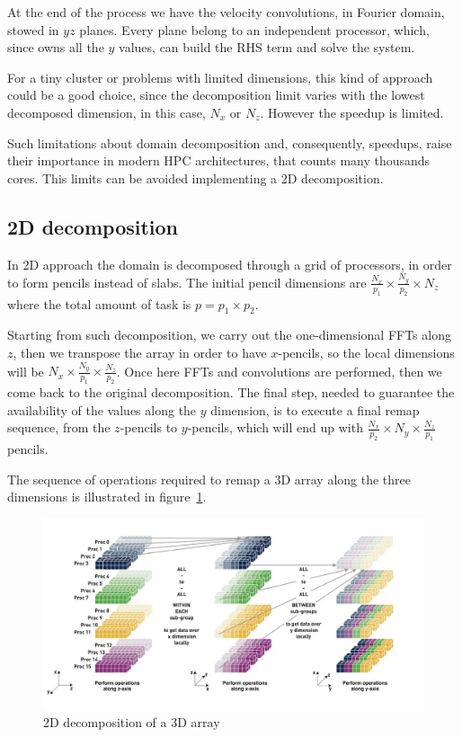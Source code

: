 \par
At the end of the process we have the velocity convolutions, in Fourier domain, stowed in $yz$ planes. Every plane belong to an independent processor, which, since owns all the $y$ values, can build the RHS term and solve the system.\par
For a tiny cluster or problems with limited dimensions, this kind of approach could be a good choice, since the decomposition limit varies with the lowest decomposed dimension, in this case, $N_{x}$ or $N_{z}$. However the speedup is limited. 
\par
Such limitations about domain decomposition and, consequently, speedups, raise their importance in modern HPC architectures, that counts many thousands cores.  
This limits can be avoided implementing a 2D decomposition.





\subsection{2D decomposition}
In 2D approach the domain is decomposed through a grid of processors, in order to form pencils instead of slabs. The initial pencil dimensions are $\frac{N_{x}}{p_{1}}\times \frac{N_{y}}{p_{2}}\times N_{z}$ where the total amount of task is $p = p_{1}\times p_{2}$.
\par

Starting from such decomposition, we carry out the one-dimensional FFTs along $z$, then we transpose the array in order to have $x$-pencils, so the local dimensions will be $N_{x} \times \frac{N_{y}}{p_{1}} \times \frac{N_{z}}{p_{2}}$. Once here FFTs and convolutions are performed, then we come back to the original decomposition. The final step, needed to guarantee the availability of the values along the $y$ dimension, is to execute a final remap sequence, from the $z$-pencils to $y$-pencils, which will end up with $\frac{N_{x}}{p_{2}} \times N_{y} \times \frac{N_{z}}{p_{1}}$ pencils.

The sequence of operations required to remap a 3D array along the three dimensions is illustrated in figure~\ref{2d:decomp}. 
\par
\begin{figure}
\begin{center}
\includegraphics[width=1.08\textwidth]{grafici/2d_decomp}
\caption{2D decomposition of a 3D array}
\label{2d:decomp}
\end{center}
\end{figure}

